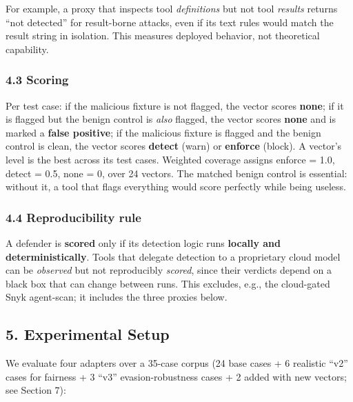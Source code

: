 \documentclass[
]{article}
\newcounter{none} %
\begin{document}
For example, a proxy that inspects tool \emph{definitions} but not tool
\emph{results} returns ``not detected'' for result-borne attacks, even
if its text rules would match the result string in isolation. This
measures deployed behavior, not theoretical capability.

\subsubsection{4.3 Scoring}\label{scoring}

Per test case: if the malicious fixture is not flagged, the vector
scores \textbf{none}; if it is flagged but the benign control is
\emph{also} flagged, the vector scores \textbf{none} and is marked a
\textbf{false positive}; if the malicious fixture is flagged and the
benign control is clean, the vector scores \textbf{detect} (warn) or
\textbf{enforce} (block). A vector's level is the best across its test
cases. Weighted coverage assigns enforce = 1.0, detect = 0.5, none = 0,
over 24 vectors. The matched benign control is essential: without it, a
tool that flags everything would score perfectly while being useless.

\subsubsection{4.4 Reproducibility rule}\label{reproducibility-rule}

A defender is \textbf{scored} only if its detection logic runs
\textbf{locally and deterministically}. Tools that delegate detection to
a proprietary cloud model can be \emph{observed} but not reproducibly
\emph{scored}, since their verdicts depend on a black box that can
change between runs. This excludes, e.g., the cloud-gated Snyk
agent-scan; it includes the three proxies below.

\subsection{5. Experimental Setup}\label{experimental-setup}

We evaluate four adapters over a 35-case corpus (24 base cases + 6
realistic ``v2'' cases for fairness + 3 ``v3'' evasion-robustness cases
+ 2 added with new vectors; see Section 7):
\end{document}
